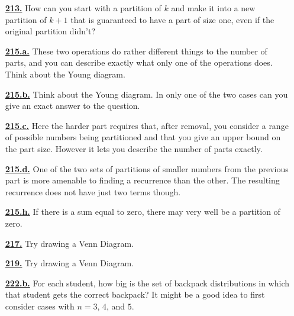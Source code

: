 \documentclass[10pt,]{book}
\theoremstyle{plain}
\theoremstyle{definition}
\theoremstyle{definition}
\theoremstyle{definition}
\numberwithin{equation}{chapter}
\begin{document}
\begin{itemize}[itemsep=1em]
\hypertarget{a-213}{}\item[\textbf{\hyperref[activity-206]{213.}}]
\hypertarget{p-1139}{}%
How can you start with a partition of \(k\) and make it into a new partition of \(k+1\) that is guaranteed to have a part of size one, even if the original partition didn't?%

\hypertarget{a-215.a}{}\item[\textbf{\hyperref[task-219]{215.a.}}]
\hypertarget{p-1147}{}%
These two operations do rather different things to the number of parts, and you can describe exactly what only one of the operations does. Think about the Young diagram.%

\hypertarget{a-215.b}{}\item[\textbf{\hyperref[task-220]{215.b.}}]
\hypertarget{p-1150}{}%
Think about the Young diagram. In only one of the two cases can you give an exact answer to the question.%

\hypertarget{a-215.c}{}\item[\textbf{\hyperref[task-221]{215.c.}}]
\hypertarget{p-1153}{}%
Here the harder part requires that, after removal, you consider a range of possible numbers being partitioned and that you give an upper bound on the part size. However it lets you describe the number of parts exactly.%

\hypertarget{a-215.d}{}\item[\textbf{\hyperref[task-222]{215.d.}}]
\hypertarget{p-1157}{}%
One of the two sets of partitions of smaller numbers from the previous part is more amenable to finding a recurrence than the other. The resulting recurrence does not have just two terms though.%

\hypertarget{a-215.h}{}\item[\textbf{\hyperref[task-226]{215.h.}}]
\hypertarget{p-1165}{}%
If there is a sum equal to zero, there may very well be a partition of zero.%

\hypertarget{a-217}{}\item[\textbf{\hyperref[twosetintersection]{217.}}]
\hypertarget{p-1172}{}%
Try drawing a Venn Diagram.%

\hypertarget{a-219}{}\item[\textbf{\hyperref[threesetintersection]{219.}}]
\hypertarget{p-1178}{}%
Try drawing a Venn Diagram.%

\hypertarget{a-222.b}{}\item[\textbf{\hyperref[task-228]{222.b.}}]
\hypertarget{p-1190}{}%
For each student, how big is the set of backpack distributions in which that student gets the correct backpack?  It might be a good idea to first consider cases with \(n=3\), \(4\), and \(5\).%


\end{itemize}
\end{document}
